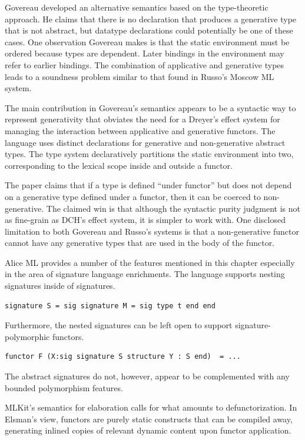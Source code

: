 Govereau \cite{govereau:tr05} developed an alternative
semantics based on the type-theoretic approach. He claims that there
is no declaration that produces a generative type that is not
abstract, but datatype declarations could potentially be one of these
cases. One observation Govereau makes is that the static environment
must be ordered because types are dependent. Later bindings in the environment may refer to earlier bindings. The combination of applicative and generative types leads to a soundness problem similar to that found in Russo's Moscow ML system. 

The main contribution in Govereau's semantics appears to be a syntactic way to represent generativity that obviates the need for a Dreyer's effect system for managing the interaction between applicative and generative functors. The language uses distinct declarations for generative and non-generative abstract types. The type system declaratively partitions the static environment into two, corresponding to the lexical scope inside and outside a functor. 

The paper claims that if a type is defined ``under functor'' but does
not depend on a generative type defined under a functor, then it can
be coerced to non-generative. The claimed win is that although the syntactic purity judgment is not as fine-grain as DCH's effect system, it is simpler to work with. One disclosed limitation to both Govereau and Russo's systems is that a non-generative functor cannot have any generative types that are used in the body of the functor. 

Alice ML provides a number of the features mentioned in this chapter especially in the 
area of signature language enrichments. The language supports nesting signatures inside of signatures.
\begin{lstlisting} 
signature S = sig signature M = sig type t end end
\end{lstlisting}
Furthermore, the nested signatures can be left open to support signature-polymorphic functors.
\begin{lstlisting}
functor F (X:sig signature S structure Y : S end)  = ...
\end{lstlisting} 
The abstract signatures do not, however, appear to be complemented with any bounded polymorphism features. 

MLKit's semantics for elaboration calls for what amounts to defunctorization. In Elsman's view, functors are purely static constructs that can be compiled away, generating inlined copies of relevant dynamic content upon functor application. 
 
